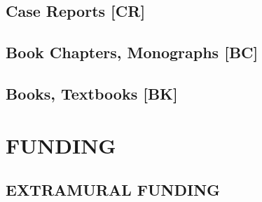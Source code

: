 \documentclass[11pt]{article}
\begin{document}

\subsection*{Case Reports [CR] \ {}} 
\subsection*{Book Chapters, Monographs [BC] \ {}}
\subsection*{Books, Textbooks [BK] \ {}}

\section*{FUNDING}

\subsection*{EXTRAMURAL FUNDING}
\end{document}
